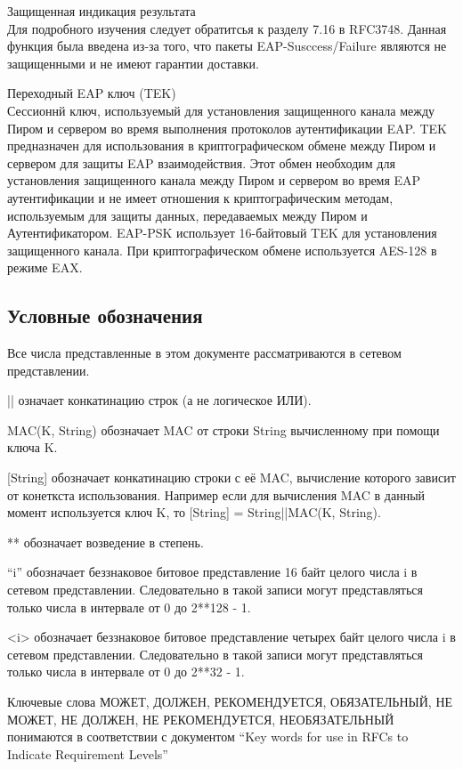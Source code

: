 Защищенная индикация результата \\ Для подробного изучения следует обратитсья к разделу 7.16 в RFC3748. Данная функция была введена из-за того, что пакеты EAP-Susccess/Failure являются не защищенными и не имеют гарантии доставки.

Переходный EAP ключ (TEK) \\ Сессионнй ключ, используемый для установления защищенного канала между Пиром и сервером во время выполнения протоколов аутентификации EAP. TEK предназначен для использования в криптографическом обмене между Пиром и сервером для защиты EAP взаимодействия. Этот обмен необходим для установления защищенного канала между Пиром и сервером во время EAP аутентификации и не имеет отношения к криптографическим методам, используемым для защиты данных, передаваемых между Пиром и Аутентификатором. EAP-PSK использует 16-байтовый TEK для установления защищенного канала. При криптографическом обмене используется AES-128 в режиме EAX.

\subsection{Условные обозначения}

Все числа представленные в этом документе рассматриваются в сетевом представлении.

|| означает конкатинацию строк (а не логическое ИЛИ).

MAC(K, String) обозначает MAC от строки String вычисленному при помощи ключа K.

[String] обозначает конкатинацию строки с её MAC, вычисление которого зависит от конеткста использования. Например если для вычисления MAC в данный момент используется ключ K, то [String] = String||MAC(K, String).

** обозначает возведение в степень.

``i'' обозначает беззнаковое битовое представление 16 байт целого числа i в сетевом представлении. Следовательно в такой записи могут представляться только числа в интервале от 0 до 2**128 - 1.

<i> обозначает беззнаковое битовое представление четырех байт целого числа i в сетевом представлении. Следовательно в такой записи могут представляться только числа в интервале от 0 до 2**32 - 1.

Ключевые слова МОЖЕТ, ДОЛЖЕН, РЕКОМЕНДУЕТСЯ, ОБЯЗАТЕЛЬНЫЙ, НЕ МОЖЕТ, НЕ ДОЛЖЕН, НЕ РЕКОМЕНДУЕТСЯ, НЕОБЯЗАТЕЛЬНЫЙ понимаются в соответствии с документом ``Key words for use in RFCs to Indicate Requirement Levels''

